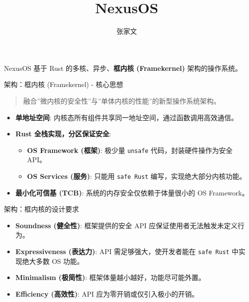 \documentclass[
  ignorenonframetext,
]{beamer}
\title{NexusOS}
\author{张家文}
\date{}
\providecommand{\tightlist}{%
  \setlength{\itemsep}{0pt}\setlength{\parskip}{0pt}}
\begin{document}
\frame{\titlepage}


\begin{frame}{NexusOS}
\label{nexusos}
基于 Rust 的多核、异步、\textbf{框内核 (Framekernel)} 架构的操作系统。
\end{frame}

\begin{frame}
\begin{block}{架构：框内核 (Framekernel) - 核心思想}
\label{ux67b6ux6784ux6846ux5185ux6838-framekernel---ux6838ux5fc3ux601dux60f3}
\begin{quote}
融合''微内核的安全性''与''单体内核的性能''的新型操作系统架构。
\end{quote}

\begin{itemize}
\tightlist
\item
  \textbf{单地址空间}:
  内核态所有组件共享同一地址空间，通过函数调用高效通信。
\end{itemize}
\end{block}
\end{frame}

\begin{frame}[fragile]
\begin{itemize}
\tightlist
\item
  \textbf{Rust 全栈实现，分区保证安全}:

  \begin{itemize}
  \tightlist
  \item
    \textbf{OS Framework (框架)}: 极少量 \texttt{unsafe}
    代码，封装硬件操作为安全 API。
  \item
    \textbf{OS Services (服务)}: 只能用 \texttt{safe\ Rust}
    编写，实现绝大部分内核功能。
  \end{itemize}
\item
  \textbf{最小化可信基 (TCB)}: 系统的内存安全仅依赖于体量很小的 OS
  Framework。
\end{itemize}
\end{frame}

\begin{frame}[fragile]
\begin{block}{架构：框内核的设计要求}
\label{ux67b6ux6784ux6846ux5185ux6838ux7684ux8bbeux8ba1ux8981ux6c42}
\begin{itemize}
\tightlist
\item
  \textbf{Soundness (健全性)}: 框架提供的安全 API
  应保证使用者无法触发未定义行为。
\item
  \textbf{Expressiveness (表达力)}: API 需足够强大，使开发者能在
  \texttt{safe\ Rust} 中实现绝大多数 OS 功能。
\item
  \textbf{Minimalism (极简性)}: 框架体量越小越好，功能尽可能外置。
\item
  \textbf{Efficiency (高效性)}: API 应为零开销或仅引入极小的开销。
\end{itemize}
\end{block}
\end{frame}
\end{document}
